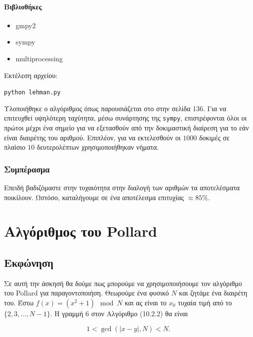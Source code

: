 \documentclass[oneside]{article}
\let\t\texttt
\begin{document}
\paragraph{Βιβλιοθήκες}

\begin{itemize}
    \item gmpy2
    \item sympy
    \item multiprocessing
\end{itemize}

Εκτέλεση αρχείου:

\begin{center}
    \t{python lehman.py}
\end{center}

Υλοποιήθηκε ο αλγόριθμος όπως παρουσιάζεται στο \cite{draz:2022} στην σελίδα 136.
Για να επιτευχθεί υψηλότερη ταχύτητα, μέσω συνάρτησης της \t{sympy}, επιστρέφονται όλοι οι πρώτοι μέχρι ένα σημείο για να εξετασθούν από την δοκιμαστική διαίρεση για το εάν είναι διαιρέτης του αριθμού. Επιπλέον, για να εκτελεσθούν οι $1000$ δοκιμές σε πλαίσιο $10$ δευτερολέπτων χρησιμοποιήθηκαν νήματα.

\subsubsection{Συμπέρασμα}

Επειδή βαδιζόμαστε στην τυχαιότητα στην διαλογή των αριθμών τα αποτελέσματα ποικίλουν. Ωστόσο, καταλήγουμε σε ένα αποτέλεσμα επιτυχίας $\approx 85\%$.

\section{Αλγόριθμος του Pollard}

\subsection{Εκφώνηση} 

Σε αυτή την άσκησή θα δούμε πως μπορούμε να χρησιμοποιήσουμε τον αλγόριθμο του Pollard για παραγοντοποιήση. Θεωρούμε ένα φυσικό $N$ και ζητάμε ένα διαιρέτη του. Έστω $f(x) = (x^2 + 1) \mod{N}$ και ας είναι το $x_0$ τυχαία τιμή από το $\{
2, 3, ..., N - 1\}$. Η γραμμή 6 στον Αλγόριθμο (10.2.2) θα είναι

\begin{equation*}
        1 < \gcd(|x - y|, N) < N.
\end{equation*}
\end{document}
